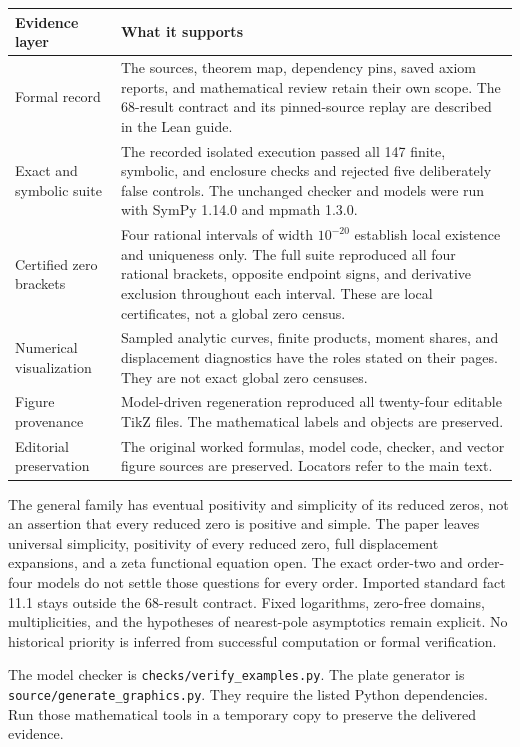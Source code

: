 {\small
\begin{tabularx}{\linewidth}{@{}p{.24\linewidth}Y@{}}\toprule
\textbf{Evidence layer} & \textbf{What it supports}\\\midrule
Formal record & The sources, theorem map, dependency pins, saved axiom reports, and mathematical review retain their own scope. The 68-result contract and its pinned-source replay are described in the Lean guide.\\
Exact and symbolic suite & The recorded isolated execution passed all 147 finite, symbolic, and enclosure checks and rejected five deliberately false controls. The unchanged checker and models were run with SymPy 1.14.0 and mpmath 1.3.0.\\
Certified zero brackets & Four rational intervals of width $10^{-20}$ establish local existence and uniqueness only. The full suite reproduced all four rational brackets, opposite endpoint signs, and derivative exclusion throughout each interval. These are local certificates, not a global zero census.\\
Numerical visualization & Sampled analytic curves, finite products, moment shares, and displacement diagnostics have the roles stated on their pages. They are not exact global zero censuses.\\
Figure provenance & Model-driven regeneration reproduced all twenty-four editable TikZ files. The mathematical labels and objects are preserved.\\
Editorial preservation & The original worked formulas, model code, checker, and vector figure sources are preserved. Locators refer to the main text.\\\bottomrule
\end{tabularx}}

The general family has eventual positivity and simplicity of its reduced zeros, not an assertion that every reduced zero is positive and simple. The paper leaves universal simplicity, positivity of every reduced zero, full displacement expansions, and a zeta functional equation open. The exact order-two and order-four models do not settle those questions for every order.
Imported standard fact 11.1 stays outside the 68-result contract. Fixed logarithms, zero-free domains, multiplicities, and the hypotheses of nearest-pole asymptotics remain explicit. No historical priority is inferred from successful computation or formal verification.

The model checker is \texttt{checks/verify\_examples.py}. The plate generator is \texttt{source/generate\_graphics.py}. They require the listed Python dependencies. Run those mathematical tools in a temporary copy to preserve the delivered evidence.

